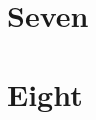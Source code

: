 \hypertarget{seven}{%
\section{Seven}\label{seven}}

\hypertarget{eight}{%
\section{Eight}\label{eight}}





